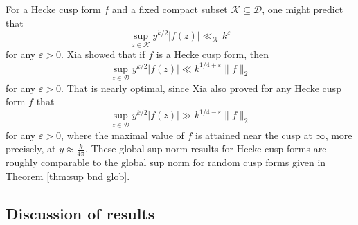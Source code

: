 \documentclass[12pt, a4paper]{amsart}
\newcommand{\tmop}[1]{\ensuremath{\operatorname{#1}}}
\theoremstyle{definition}
\newcommand {\1} {\mathbf{1}}
\newcommand {\Dc} {\mathcal{D}}
\newcommand {\Kc} {\mathcal{K}}
\newcommand{\fixme}[1]{\footnote{Fixme: #1}}
\numberwithin{equation}{section}
\begin{document}
\vspace{2mm}

For a Hecke cusp form $f$ and a
fixed compact subset $\Kc\subseteq\Dc$, one might predict that
\begin{equation}
\label{eq:bound ansatz}
\sup_{z \in \Kc} y^{k/2} |f(z)| \ll_{\Kc} k^{\varepsilon}
\end{equation}
for any $\varepsilon>0$.
Xia \cite{xia-2007} showed that if $f$ is a Hecke cusp form, then
\begin{equation}
\label{eq:Xia <<}
 \sup_{z \in \Dc} y^{k/2} |f(z)| \ll k^{1/4+\varepsilon} \lVert f \rVert_2
\end{equation}
for any $\varepsilon>0$. That is nearly optimal, since Xia also proved for any Hecke cusp form $f$ that
\begin{equation}
\label{eq:Xia >>}
 \sup_{z \in \Dc} y^{k/2} |f(z)| \gg k^{1/4-\varepsilon} \lVert f \rVert_2
\end{equation}
for any $\varepsilon>0$, where the maximal value of $f$ is attained near the cusp at $\infty$, more precisely, at $y\approx \frac{k}{4\pi}$.
These global sup norm results for Hecke cusp forms are roughly comparable to the global sup norm for random cusp forms given in Theorem \ref{thm:sup bnd glob}.






\subsection{Discussion of results}
\end{document}
